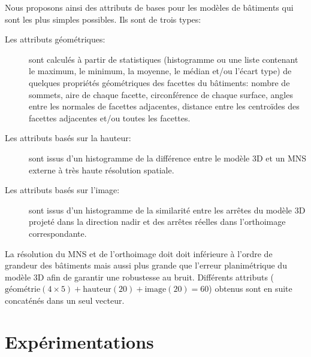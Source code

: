         Nous proposons ainsi des attributs de bases pour les modèles de bâtiments qui sont les plus simples possibles.
        Ils sont de trois types:
        \begin{description}
            \item[Les attributs géométriques: ] sont calculés à partir de statistiques (histogramme ou une liste contenant le maximum, le minimum, la moyenne, le médian et/ou l'écart type) de quelques propriétés géométriques des facettes du bâtiments: nombre de sommets, aire de chaque facette, circonférence de chaque surface, angles entre les normales de facettes adjacentes, distance entre les centroïdes des facettes adjacentes et/ou toutes les facettes.
            \item[Les attributs basés sur la hauteur: ] sont issus d'un histogramme de la différence entre le modèle 3D et un MNS externe à très haute résolution spatiale.
            \item[Les attributs basés sur l'image: ] sont issus d'un histogramme de la similarité entre les arrêtes du modèle 3D projeté dans la direction nadir et des arrêtes réelles dans l'orthoimage correspondante.
        \end{description}

        La résolution du MNS et de l'orthoimage doit doit inférieure à l'ordre de grandeur des bâtiments mais aussi plus grande que l'erreur planimétrique du modèle 3D afin de garantir une robustesse au bruit.
        Différents attributs (\(\text{géométrie}(4\times5) + \text{hauteur}(20) + \text{image}(20) = 60\)) obtenus sont en suite concaténés dans un seul vecteur.
\section*{Expérimentations}

